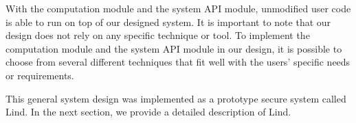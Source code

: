 With the computation module and the system API module, unmodified user code is able to run on top of our designed system. 
It is important to note that our design does not rely on any specific technique or tool. 
To implement the computation module and the system API module in our design, 
it is possible to choose from several different techniques that fit well with the users' specific needs or requirements.

This general system design was implemented as a prototype secure system called Lind. 
In the next section, we provide a detailed description of Lind.
